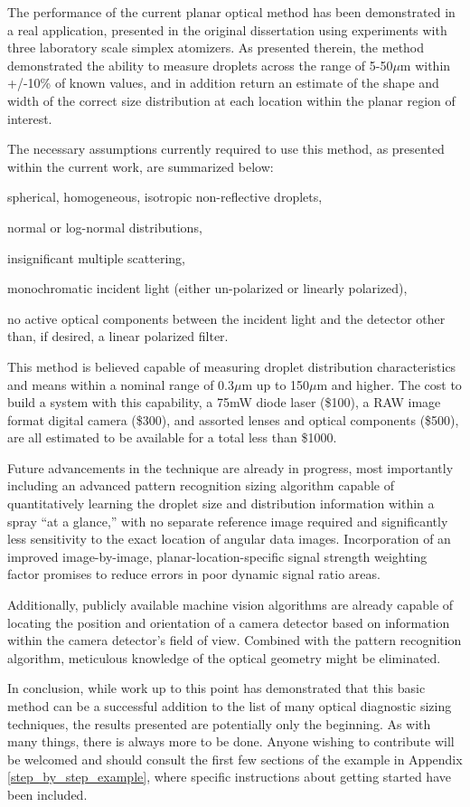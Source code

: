 The performance of the current planar optical method has been demonstrated in a real application, presented in the original dissertation \cite{LePera_dissertation} using experiments with three laboratory scale simplex atomizers.  As presented therein, the method demonstrated the ability to measure droplets across the range of 5-50$\mu$m within +/-10\% of known values, and in addition return an estimate of the shape and width of the correct size distribution at each location within the planar region of interest.  

The necessary assumptions currently required to use this method, as presented within the current work, are summarized below:
\begin{compactitem}
\item spherical, homogeneous, isotropic non-reflective droplets,
\item normal or log-normal distributions, 
\item insignificant multiple scattering, 
\item monochromatic incident light (either un-polarized or linearly polarized), 
\item no active optical components between the incident light and the detector other than, if desired, a linear polarized filter.
\end{compactitem}
\vspace*{0.15in}

This method is believed capable of measuring droplet distribution characteristics and means within a nominal range of 0.3$\mu$m up to 150$\mu$m and higher.  The cost to build a system with this capability, a 75mW diode laser (\$100), a RAW image format digital camera (\$300), and assorted lenses and optical components (\$500), are all estimated to be available for a total less than \$1000.

Future advancements in the technique are already in progress, most importantly including an advanced pattern recognition sizing algorithm capable of quantitatively learning the droplet size and distribution information within a spray ``at a glance,'' with no separate reference image required and significantly less sensitivity to the exact location of angular data images.  Incorporation of an improved image-by-image, planar-location-specific signal strength weighting factor promises to reduce errors in poor dynamic signal ratio areas.

Additionally, publicly available machine vision algorithms are already capable of locating the position and orientation of a camera detector based on information within the camera detector's field of view.  Combined with the pattern recognition algorithm, meticulous knowledge of the optical geometry might be eliminated. 

In conclusion, while work up to this point has demonstrated that this basic method can be a successful addition to the list of many optical diagnostic sizing techniques, the results presented are potentially only the beginning.  As with many things, there is always more to be done.  Anyone wishing to contribute will be welcomed and should consult the first few sections of the example in Appendix \ref{step_by_step_example}, where specific instructions about getting started have been included.